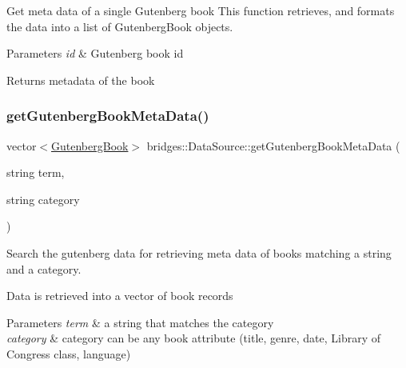 Get meta data of a single Gutenberg book This function retrieves, and formats the data into a list of Gutenberg\+Book objects. 


\begin{DoxyParams}{Parameters}
{\em id} & Gutenberg book id\\
\hline
\end{DoxyParams}
\begin{DoxyReturn}{Returns}
metadata of the book 
\end{DoxyReturn}
\mbox{\label{classbridges_1_1_data_source_a2fe055cad56b45186df7e1974f688a6b}} 
\subsubsection{\texorpdfstring{get\+Gutenberg\+Book\+Meta\+Data()}{getGutenbergBookMetaData()}\hspace{0.1cm}{\footnotesize\ttfamily [2/2]}}
{\footnotesize\ttfamily vector$<$\hyperlink{classbridges_1_1dataset_1_1_gutenberg_book}{Gutenberg\+Book}$>$ bridges\+::\+Data\+Source\+::get\+Gutenberg\+Book\+Meta\+Data (\begin{DoxyParamCaption}\item[{string}]{term,  }\item[{string}]{category }\end{DoxyParamCaption})\hspace{0.3cm}{\ttfamily [inline]}}



Search the gutenberg data for retrieving meta data of books matching a string and a category. 

Data is retrieved into a vector of book records


\begin{DoxyParams}{Parameters}
{\em term} & a string that matches the category \\
\hline
{\em category} & category can be any book attribute (title, genre, date, Library of Congress class, language) \\
\hline
\end{DoxyParams}
\mbox{\label{classbridges_1_1_data_source_a4debe81d7980b2cb5c22f8fc0bd02f60}} 
